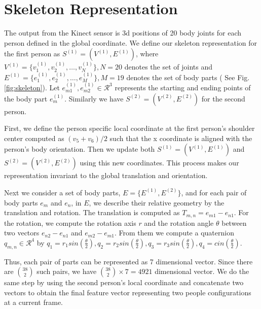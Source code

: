 \documentclass[10pt,twocolumn,letterpaper]{article}
\begin{document}
\section{Skeleton Representation}\label{sec:Feat}


The output from the Kinect sensor is 3d positions of 20 body joints for each person defined in the global coordinate. We define our skeleton representation for the first person as $S^{(1)}=(V^{(1)},E^{(1)})$, where $V^{(1)}=\{v_{1}^{(1)},v_{2}^{(1)},\dots,v_{N}^{(1)}\}, N=20$ denotes the set of joints and $E^{(1)}=\{e_{1}^{(1)},e_{2}^{(1)},\dots,e_{M}^{(1)}\}, M=19$ denotes the set of body parts ( See Fig.\ref{fig:skeleton}). Let $e_{m1}^{(1)},e_{m2}^{(1)} \in \mathcal{R}^3$ represents the starting and ending points of the body part $e_{m}^{(1)}$. Similarly we have $S^{(2)}=(V^{(2)},E^{(2)})$ for the second person.

First, we define the person specific local coordinate at the first person's shoulder center computed as $(v_5 + v_6)/2$ such that the x coordinate is aligned with the person's body orientation. Then we update both $S^{(1)}=(V^{(1)},E^{(1)})$ and $S^{(2)}=(V^{(2)},E^{(2)})$ using this new coordinates. This process makes our representation invariant to the global translation and orientation. 

Next we consider a set of body parts, $E=\{E^{(1)},E^{(2)}\}$, and for each pair of body parts $e_m$ and $e_n$, in $E$, we describe their relative geometry by the translation and rotation. The translation is computed as $T_{m,n}=e_{m1}-e_{n1}$. For the rotation, we compute the rotation axis $r$ and the rotation angle $\theta$ between two vectors $e_{n2}-e_{n1}$ and $e_{m2}-e_{m1}$. From them we compute a quaternion $q_{m,n} \in \mathcal{R}^4$ by $q_1=r_1 sin( \frac{\theta}{2} ), q_2=r_2 sin( \frac{\theta}{2} ), q_3=r_3 sin( \frac{\theta}{2}), q_4=cin( \frac{\theta}{2})$.

Thus, each pair of parts can be represented as 7 dimensional vector. Since there are $\binom{38}{2}$ such pairs, we have $\binom{38}{2} \times 7 = 4921$ dimensional vector. We do the same step by using the second person's local coordinate and concatenate two vectors to obtain the final feature vector representing two people configurations at a current frame.
\end{document}
